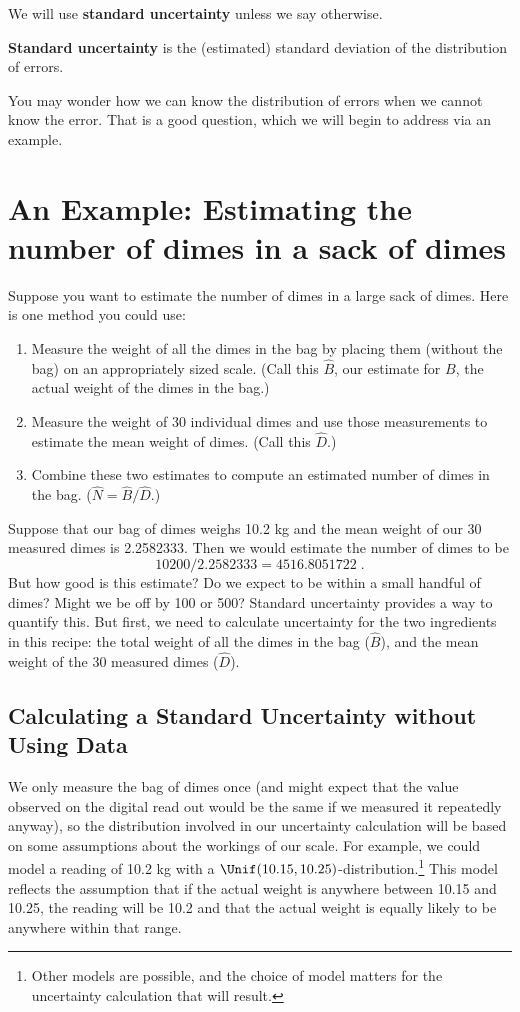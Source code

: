 \documentclass[twoside]{book}\usepackage[]{graphicx}\usepackage[]{xcolor}
\def\term#1{\textbf{#1}}
\newlength{\tempfmlength}
\newenvironment{fmpage}[1]
     {
	 \medskip
	 \setlength{\tempfmlength}{#1}
	 \begin{lrbox}{\fmbox}
	   \begin{minipage}{#1}
		 \vspace*{.02\tempfmlength}
		 \hfill
	   \begin{minipage}{.95 \tempfmlength}}
		 {\end{minipage}\hfill
		 \vspace*{.015\tempfmlength}
		 \end{minipage}\end{lrbox}\fbox{\usebox{\fmbox}}
	 \medskip
	 }
\newenvironment{boxedText}[1][.98\textwidth]%
{%
\begin{center}
\begin{fmpage}{#1}
}%
{%
\end{fmpage}
\end{center}
}
\newcounter{example}[section]
\begin{document}
We will use \term{standard uncertainty} unless we say otherwise.
\begin{boxedText}
	\term{Standard uncertainty} is the (estimated) standard deviation of 
	the distribution of errors.
\end{boxedText}
You may wonder how we can know the distribution of errors when we cannot know the error.
That is a good question, which we will begin to address via an example.

\section{An Example: Estimating the number of dimes in a sack of dimes}


Suppose you want to estimate the number of dimes in a large sack of dimes.  Here is one method
you could use:

\begin{enumerate}
	\item Measure the weight of all the dimes in the bag by placing them (without the bag)
		on an appropriately sized scale.  (Call this $\hat B$, our estimate for $B$,
		the actual weight of the dimes in the bag.)
	\item
		Measure the weight of 30 individual dimes and use those measurements to
		estimate the mean weight of dimes. (Call this $\hat D$.)
	\item
		Combine these two estimates to compute an estimated number of dimes in the bag.
		($\hat N = \hat B / \hat D$.)
\end{enumerate}

Suppose that our bag of dimes weighs 10.2 kg and the mean weight of our 30 measured dimes is
2.2582333.  Then we would estimate the number of dimes to be 
\[
10200 / 2.2582333 = 4516.8051722 \;.
\]
But how good is this estimate?  Do we expect to be within a small handful of dimes?  Might we be 
off by 100 or 500?  Standard uncertainty provides a way to quantify this.  But first, 
we need to calculate uncertainty for the two ingredients in this recipe: 
the total weight of all the dimes in the bag ($\hat B$), and the mean weight of the 
30 measured dimes ($\hat D$).

\subsection{Calculating a Standard Uncertainty without Using Data}

We only measure the bag of dimes once (and might expect that the value
observed on the digital read out would be the same if we measured it repeatedly
anyway), so the distribution involved in our uncertainty calculation will be 
based on some assumptions about the workings of our scale.  For example, we could
model a reading of 10.2 kg with
a $\Unif(10.15, 10.25)$-distribution.\footnote{Other models are possible, and the choice of 
model matters for the uncertainty calculation that will result.}  
This model reflects the assumption that if the actual weight is anywhere between 10.15 and 10.25,
the reading will be 10.2 and that the actual weight is equally likely to be anywhere within
that range.
\end{document}
